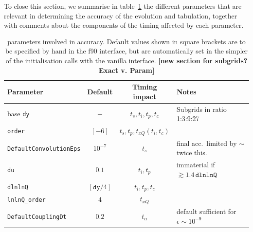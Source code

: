 \documentclass[12pt]{article}
\newcommand{\comment}[1]{\textbf{[#1]}}
\newcommand{\ttt}[1]{\texttt{#1}}
\begin{document}
To close this section, we summarise in table~\ref{tab:acc-param} the
different parameters that are relevant in determining the accuracy of
the evolution and tabulation, together with comments about the
components of the timing affected by each parameter.


\begin{table}
  \centering
  \begin{tabular}{|l|c|c|l|} \hline
    Parameter & Default & Timing impact & Notes \\ \hline
    base \ttt{dy}  &  $-$    &   $t_s, t_i, t_p, t_c$    & Subgrids
    in ratio 1:3:9:27 \\
    \ttt{order} &  $[-6]$    &   $t_s, t_p, t_{xQ} (t_i, t_c)$ & \\ 
    \ttt{DefaultConvolutionEps} & $10^{-7}$ & $t_s$ & final acc.\
    limited by $\sim$ twice this.\\ \hline
    \ttt{du}  &  $0.1$ &  $t_i, t_p$ & immaterial if $\gtrsim 1.4\,
    \ttt{dlnlnQ}$\\
    \ttt{dlnlnQ}       &  $[\ttt{dy}/4] $ &  $t_i, t_p, t_c$ &  \\
    \ttt{lnlnQ\_order} &  $4$ &  $t_{xQ}$ &  \\ \hline
    \ttt{DefaultCouplingDt} & $0.2$ & $t_\alpha$ & default sufficient for $\epsilon \sim 10^{-9}$\\
    \hline
  \end{tabular}
  \caption{parameters involved in accuracy. Default values shown in square
    brackets are to be specified by hand in the f90 interface, but are
    automatically set in the simpler of the initialisation calls with
    the vanilla interface. \comment{new section for subgrids? Exact
      v. Param}}
  \label{tab:acc-param}
\end{table}
\end{document}

